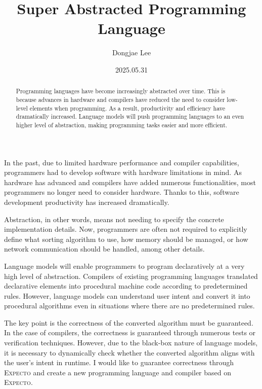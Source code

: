 \documentclass[11pt, oneside]{article}
\title{Super Abstracted Programming Language}
\author{Dongjae Lee}
\date{2025.05.31}
\begin{document}
\maketitle

\begin{abstract}
	Programming languages have become increasingly abstracted over time. This is because advances in hardware and compilers have reduced the need to consider low-level elements when programming. As a result, productivity and efficiency have dramatically increased. Language models will push programming languages to an even higher level of abstraction, making programming tasks easier and more efficient.
\end{abstract}

In the past, due to limited hardware performance and compiler capabilities,
programmers had to develop software with hardware limitations in mind. As
hardware has advanced and compilers have added numerous functionalities, most
programmers no longer need to consider hardware. Thanks to this, software
development productivity has increased dramatically.

Abstraction, in other words, means not needing to specify the concrete
implementation details. Now, programmers are often not required to explicitly
define what sorting algorithm to use, how memory should be managed, or how
network communication should be handled, among other details.

Language models will enable programmers to program declaratively at a very high
level of abstraction. Compilers of existing programming languages translated
declarative elements into procedural machine code according to predetermined
rules. However, language models can understand user intent and convert it into
procedural algorithms even in situations where there are no predetermined
rules.

The key point is the correctness of the converted algorithm must be guaranteed.
In the case of compilers, the correctness is guaranteed through
numerous tests or verification techniques. However, due to the black-box nature of language models,
it is necessary to dynamically check whether the converted algorithm
aligns with the user's intent in runtime. I would like to guarantee correctness
through \textsc{Expecto} and create a new programming language and compiler
based on \textsc{Expecto}.
\end{document}
